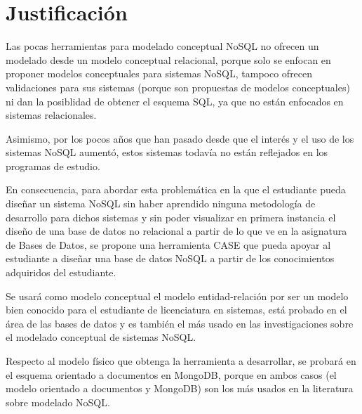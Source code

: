 \section{Justificación}

Las pocas herramientas para modelado conceptual NoSQL no ofrecen un modelado desde un modelo conceptual relacional, porque solo se enfocan en proponer modelos conceptuales para sistemas NoSQL, tampoco ofrecen validaciones para sus sistemas (porque son propuestas de modelos conceptuales) ni dan la posiblidad de obtener el esquema SQL, ya que no están enfocados en sistemas relacionales.


Asimismo, por los pocos años que han pasado desde que el interés y el uso de los sistemas NoSQL aumentó, estos sistemas todavía no están reflejados en los programas de estudio.


En consecuencia, para abordar esta problemática en la que el estudiante pueda diseñar un sistema NoSQL sin haber aprendido ninguna metodología de desarrollo para dichos sistemas y sin poder visualizar en primera instancia el diseño de una base de datos no relacional a partir de lo que ve en la asignatura de Bases de Datos, se propone una herramienta CASE que pueda apoyar al estudiante a diseñar una base de datos NoSQL a partir de los conocimientos adquiridos del estudiante.


Se usará como modelo conceptual el modelo entidad-relación por ser un modelo bien conocido para el estudiante de licenciatura en sistemas,  está probado en el área de las bases de datos y es también el más usado en las investigaciones sobre el modelado conceptual de sistemas NoSQL.


Respecto al modelo físico que obtenga la herramienta a desarrollar, se probará en el esquema orientado a documentos en MongoDB, porque en ambos casos (el modelo orientado a documentos y MongoDB) son los más usados en la literatura sobre modelado NoSQL\cite{martinez-mosquera_modeling_2020}.

